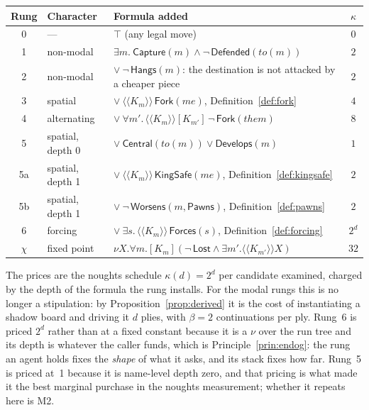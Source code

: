 \documentclass[11pt,a4paper]{article}
\theoremstyle{plain}
\theoremstyle{definition}
\theoremstyle{remark}
\newcommand{\KKmod}[1]{\langle\!\langle K_{#1}\rangle\!\rangle}
\newcommand{\Bmod}[1]{[K_{#1}]}
\begin{document}
\begin{center}
\begin{tabular}{@{}cl>{\raggedright\arraybackslash}p{6.1cm}c@{}}
\toprule
Rung & Character & Formula added & $\kappa$ \\
\midrule
0 & --- & $\top$ (any legal move) & $0$ \\
1 & non-modal & $\exists m.\ \mathsf{Capture}(m) \wedge \neg\,\mathsf{Defended}(\mathit{to}(m))$ & $2$ \\
2 & non-modal & $\vee\ \neg\,\mathsf{Hangs}(m)$: the destination is not attacked by a cheaper piece & $2$ \\
3 & spatial & $\vee\ \KKmod{m}\,\mathsf{Fork}(\mathit{me})$, Definition~\ref{def:fork} & $4$ \\
4 & alternating & $\vee\ \forall m'.\,\KKmod{m}\Bmod{m'}\,\neg\,\mathsf{Fork}(\mathit{them})$ & $8$ \\
5 & spatial, depth 0 & $\vee\ \mathsf{Central}(\mathit{to}(m)) \vee \mathsf{Develops}(m)$ & $1$ \\
5a & spatial, depth 1 & $\vee\ \KKmod{m}\,\mathsf{KingSafe}(\mathit{me})$, Definition~\ref{def:kingsafe} & $2$ \\
5b & spatial, depth 1 & $\vee\ \neg\,\mathsf{Worsens}(m,\mathsf{Pawns})$, Definition~\ref{def:pawns} & $2$ \\
6 & forcing & $\vee\ \exists s.\,\KKmod{m}\,\mathsf{Forces}(s)$, Definition~\ref{def:forcing} & $2^{d}$ \\
$\chi$ & fixed point & $\nu X.\forall m.\Bmod{m}(\neg\,\mathsf{Lost} \wedge \exists m'.\KKmod{m'} X)$ & $32$ \\
\bottomrule
\end{tabular}
\end{center}

The prices are the noughts schedule $\kappa(d) = 2^d$ per candidate examined,
charged by the depth of the formula the rung installs. For the modal rungs this
is no longer a stipulation: by Proposition~\ref{prop:derived} it is the cost of
instantiating a shadow board and driving it $d$ plies, with $\beta = 2$
continuations per ply. Rung~6 is priced $2^d$ rather than at a fixed constant
because it is a $\nu$ over the run tree and its depth is whatever the caller
funds, which is Principle~\ref{prin:endog}: the rung an agent holds fixes the
\emph{shape} of what it asks, and its stack fixes how far. Rung~5 is priced
at~1 because it is name-level depth zero, and that pricing is what made it the
best marginal purchase in the noughts measurement; whether it repeats here is
M2.
\end{document}
